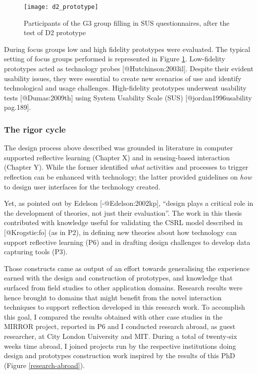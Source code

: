 \begin{figure}[h!]
    \centering
    \texttt{[image: d2\_prototype]}
    \caption{Participants of the G3 group filling in SUS questionnaires, after the test of D2 prototype}
    \label{fig:focus_group}
\end{figure}

During focus groups low and high fidelity prototypes were evaluated. The
typical setting of focus groups performed is represented in Figure
\ref{fig:focus_group}. Low-fidelity prototypes acted as technology
probes {[}@Hutchinson:2003il{]}. Despite their evident usability issues,
they were essential to create new scenarios of use and identify
technological and usage challenges. High-fidelity prototypes underwent
usability tests {[}@Dumas:2009th{]} using System Usability Scale (SUS)
{[}@jordan1996usability pag.189{]}.

\subsubsection{The rigor cycle}\label{the-rigor-cycle}

The design process above described was grounded in literature in
computer supported reflective learning (Chapter X) and in sensing-based
interaction (Chapter Y). While the former identified \emph{what}
activities and processes to trigger reflection can be enhanced with
technology; the latter provided guidelines on \emph{how} to design user
interfaces for the technology created.

Yet, as pointed out by Edelson {[}-@Edelson:2002kp{]}, ``design plays a
critical role in the development of theories, not just their
evaluation''. The work in this thesis contributed with knowledge useful
for validating the CSRL model described in {[}@Krogstie:fo{]} (as in
P2), in defining new theories about how technology can support
reflective learning (P6) and in drafting design challenges to develop
data capturing tools (P3).

Those constructs came as output of an effort towards generalising the
experience earned with the design and construction of prototypes, and
knowledge that surfaced from field studies to other application domains.
Research results were hence brought to domains that might benefit from
the novel interaction techniques to support reflection developed in this
research work. To accomplish this goal, I compared the results obtained
with other case studies in the MIRROR project, reported in P6 and I
conducted research abroad, as guest researcher, at City London
University and MIT. During a total of twenty-six weeks time abroad, I
joined projects run by the respective institutions doing design and
prototypes construction work inspired by the results of this PhD (Figure
\ref{research-abroad}).


